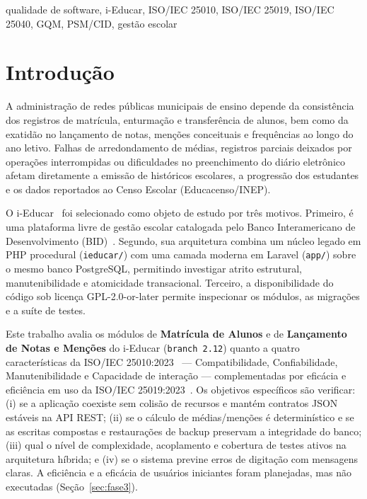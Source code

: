 \documentclass[conference]{model/IEEEtran}%
\begin{document}
\begin{IEEEkeywords}
qualidade de software, i-Educar, ISO/IEC 25010, ISO/IEC 25019, ISO/IEC 25040, GQM, PSM/CID, gestão escolar
\end{IEEEkeywords}

\section{Introdução}\label{sec:intro}

A administração de redes públicas municipais de ensino depende da consistência dos registros de matrícula, enturmação e transferência de alunos, bem como da exatidão no lançamento de notas, menções conceituais e frequências ao longo do ano letivo. Falhas de arredondamento de médias, registros parciais deixados por operações interrompidas ou dificuldades no preenchimento do diário eletrônico afetam diretamente a emissão de históricos escolares, a progressão dos estudantes e os dados reportados ao Censo Escolar (Educacenso/INEP).

O i-Educar~\cite{ieducar_repo} foi selecionado como objeto de estudo por três motivos. Primeiro, é uma plataforma livre de gestão escolar catalogada pelo Banco Interamericano de Desenvolvimento (BID)~\cite{bid_ieducar}. Segundo, sua arquitetura combina um núcleo legado em PHP procedural (\texttt{ieducar/}) com uma camada moderna em Laravel (\texttt{app/}) sobre o mesmo banco PostgreSQL, permitindo investigar atrito estrutural, manutenibilidade e atomicidade transacional. Terceiro, a disponibilidade do código sob licença GPL-2.0-or-later permite inspecionar os módulos, as migrações e a suíte de testes.

Este trabalho avalia os módulos de \textbf{Matrícula de Alunos} e de \textbf{Lançamento de Notas e Menções} do i-Educar (\texttt{branch 2.12}) quanto a quatro características da ISO/IEC 25010:2023~\cite{iso25010} --- Compatibilidade, Confiabilidade, Manutenibilidade e Capacidade de interação --- complementadas por eficácia e eficiência em uso da ISO/IEC 25019:2023~\cite{iso25019}. Os objetivos específicos são verificar: (i) se a aplicação coexiste sem colisão de recursos e mantém contratos JSON estáveis na API REST; (ii) se o cálculo de médias/menções é determinístico e se as escritas compostas e restaurações de backup preservam a integridade do banco; (iii) qual o nível de complexidade, acoplamento e cobertura de testes ativos na arquitetura híbrida; e (iv) se o sistema previne erros de digitação com mensagens claras. A eficiência e a eficácia de usuários iniciantes foram planejadas, mas não executadas (Seção~\ref{sec:fase3}).
\end{document}
